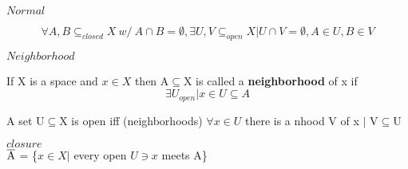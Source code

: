 \documentclass[12pt]{article}
\begin{document}
$Normal$\par
$$ \forall A,B \subseteq_{closed}X\ w/ \ A\cap B = \emptyset, \exists U,V \subseteq_{open}X | U \cap V = \emptyset, A \in U, B \in V$$

$Neighborhood$\par
If X is a space and $x\in X$ then A$\subseteq$X is called a \textbf{neighborhood} of x if
$$ \exists U_{open} | x\in U \subseteq A $$

A set U$\subseteq$X is open iff (neighborhoods)
$\forall x \in U$ there is a nhood V of x $|$ V$\subseteq$U

$closure$\\
$\overline{\rm A}$ = \{$x\in X |$ every open $U\ni x$ meets A\}
\end{document}

